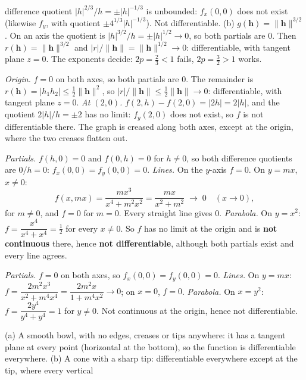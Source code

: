 \begin{solutions}
        difference quotient $|h|^{2/3}/h=\pm|h|^{-1/3}$ is unbounded:
        $f_{x}(0,0)$ does not exist (likewise $f_{y}$, with quotient
        $\pm4^{1/3}|h|^{-1/3}$). Not differentiable.
        (b) $g(\mathbf{h})=\|\mathbf{h}\|^{3/2}$. On an axis the quotient is
        $|h|^{3/2}/h=\pm|h|^{1/2}\to0$, so both partials are $0$. Then
        $r(\mathbf{h})=\|\mathbf{h}\|^{3/2}$ and
        $|r|/\|\mathbf{h}\|=\|\mathbf{h}\|^{1/2}\to0$: differentiable, with
        tangent plane $z=0$. The exponents decide: $2p=\tfrac23<1$ fails,
        $2p=\tfrac32>1$ works.
  \item \emph{Origin.} $f=0$ on both axes, so both partials are $0$. The
        remainder is $r(\mathbf{h})=|h_{1}h_{2}|\le\tfrac12\|\mathbf{h}\|^{2}$,
        so $|r|/\|\mathbf{h}\|\le\tfrac12\|\mathbf{h}\|\to0$: differentiable,
        with tangent plane $z=0$. \emph{At $(2,0)$.}
        $f(2,h)-f(2,0)=|2h|=2|h|$, and the quotient $2|h|/h=\pm2$ has no
        limit: $f_{y}(2,0)$ does not exist, so $f$ is not differentiable
        there. The graph is creased along both axes, except at the origin,
        where the two creases flatten out.
  \item \emph{Partials.} $f(h,0)=0$ and $f(0,h)=0$ for $h\neq0$, so both
        difference quotients are $0/h=0$: $f_{x}(0,0)=f_{y}(0,0)=0$.
        \emph{Lines.} On the $y$-axis $f=0$. On $y=mx$, $x\neq0$:
        \[
          f(x,mx)=\frac{mx^{3}}{x^{4}+m^{2}x^{2}}=\frac{mx}{x^{2}+m^{2}}
          \;\longrightarrow\;0\quad(x\to0),
        \]
        for $m\neq0$, and $f=0$ for $m=0$. Every straight line gives $0$.
        \emph{Parabola.} On $y=x^{2}$: $f=\dfrac{x^{4}}{x^{4}+x^{4}}=\tfrac12$
        for every $x\neq0$. So $f$ has no limit at the origin and is
        \textbf{not continuous} there, hence \textbf{not differentiable},
        although both partials exist and every line agrees.
  \item \emph{Partials.} $f=0$ on both axes, so $f_{x}(0,0)=f_{y}(0,0)=0$.
        \emph{Lines.} On $y=mx$:
        $f=\dfrac{2m^{2}x^{3}}{x^{2}+m^{4}x^{4}}=\dfrac{2m^{2}x}{1+m^{4}x^{2}}
        \to0$; on $x=0$, $f=0$. \emph{Parabola.} On $x=y^{2}$:
        $f=\dfrac{2y^{4}}{y^{4}+y^{4}}=1$ for $y\neq0$. Not continuous at the
        origin, hence not differentiable.
  \item (a) A smooth bowl, with no edges, creases or tips anywhere: it has a
        tangent plane at every point (horizontal at the bottom), so the
        function is differentiable everywhere. (b) A cone with a sharp tip:
        differentiable everywhere except at the tip, where every vertical

\end{solutions}
